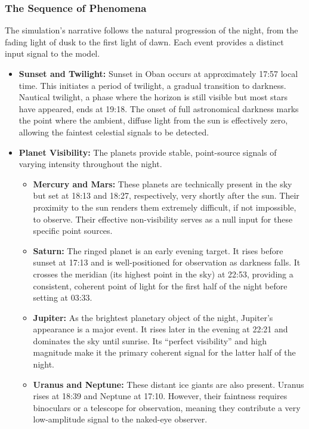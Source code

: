 \documentclass{article}
\begin{document}
\subsubsection{The Sequence of Phenomena}

The simulation's narrative follows the natural progression of the night, from the fading light of dusk to the first light of dawn. Each event provides a distinct input signal to the model.

\begin{itemize}
    \item \textbf{Sunset and Twilight:} Sunset in Oban occurs at approximately 17:57 local time. This initiates a period of twilight, a gradual transition to darkness. Nautical twilight, a phase where the horizon is still visible but most stars have appeared, ends at 19:18. The onset of full astronomical darkness marks the point where the ambient, diffuse light from the sun is effectively zero, allowing the faintest celestial signals to be detected.
    \item \textbf{Planet Visibility:} The planets provide stable, point-source signals of varying intensity throughout the night.
    \begin{itemize}
        \item \textbf{Mercury and Mars:} These planets are technically present in the sky but set at 18:13 and 18:27, respectively, very shortly after the sun. Their proximity to the sun renders them extremely difficult, if not impossible, to observe. Their effective non-visibility serves as a null input for these specific point sources.
        \item \textbf{Saturn:} The ringed planet is an early evening target. It rises before sunset at 17:13 and is well-positioned for observation as darkness falls. It crosses the meridian (its highest point in the sky) at 22:53, providing a consistent, coherent point of light for the first half of the night before setting at 03:33.
        \item \textbf{Jupiter:} As the brightest planetary object of the night, Jupiter's appearance is a major event. It rises later in the evening at 22:21 and dominates the sky until sunrise. Its ``perfect visibility'' and high magnitude make it the primary coherent signal for the latter half of the night.
        \item \textbf{Uranus and Neptune:} These distant ice giants are also present. Uranus rises at 18:39 and Neptune at 17:10. However, their faintness requires binoculars or a telescope for observation, meaning they contribute a very low-amplitude signal to the naked-eye observer.

\end{itemize}
\end{itemize}
\end{document}
